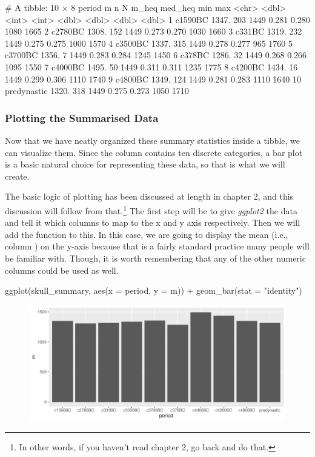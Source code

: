 \begin{outR}
# A tibble: 10 × 8
   period          m     n     N m_heq med_heq   min   max
   <chr>       <dbl> <int> <int> <dbl>   <dbl> <dbl> <dbl>
 1 c1590BC     1347.   203  1449 0.281   0.280  1080  1665
 2 c2780BC     1308.   152  1449 0.273   0.270  1030  1660
 3 c331BC      1319.   232  1449 0.275   0.275  1000  1570
 4 c3500BC     1337.   315  1449 0.278   0.277   965  1760
 5 c3700BC     1356.     7  1449 0.283   0.284  1245  1450
 6 c378BC      1286.    32  1449 0.268   0.266  1095  1550
 7 c4000BC     1495.    50  1449 0.311   0.311  1235  1775
 8 c4200BC     1434.    16  1449 0.299   0.306  1110  1740
 9 c4800BC     1349.   124  1449 0.281   0.283  1110  1640
10 predynastic 1320.   318  1449 0.275   0.273  1050  1710
\end{outR}

\subsubsection{Plotting the Summarised Data}

Now that we have neatly organized these summary statistics inside a tibble, we can visualize them. Since the  column contains ten discrete categories, a bar plot is a basic natural choice for representing these data, so that is what we will create.

The basic logic of plotting has been discussed at length in chapter 2, and this discussion will follow from that.\footnote{In other words, if you haven't read chapter 2, go back and do that.} The first step will be to give \textit{ggplot2} the data and tell it which columns to map to the x and y axis respectively. Then we will add the  function to this. In this case, we are going to display the mean (i.e., column ) on the y-axis because that is a fairly standard practice many people will be familiar with. Though, it is worth remembering that any of the other numeric columns could be used as well.

\begin{inR}
ggplot(skull_summary, aes(x = period, y = m)) +
  geom_bar(stat = "identity")
\end{inR}

\vspace{2em}

\begin{figure}[H]
\includegraphics[scale = .75]{graphics/ch3Figs/bar_1.pdf}
\end{figure}

